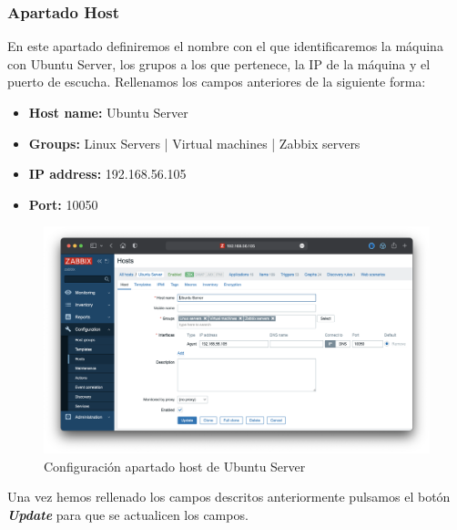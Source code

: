 \subsubsection{Apartado Host}
En este apartado definiremos el nombre con el que identificaremos la máquina con Ubuntu Server, los grupos a los que pertenece, la IP de la máquina y el puerto de escucha. Rellenamos los campos anteriores de la siguiente forma:
    \begin{itemize}
        \item \textbf{Host name:} Ubuntu Server
        \item \textbf{Groups:} Linux Servers | Virtual machines | Zabbix servers
        \item \textbf{IP address:} 192.168.56.105
        \item \textbf{Port:} 10050
    \end{itemize}
    \begin{figure}[H]
        \centering
        \includegraphics[scale=0.35]{images/ubuntu_server_conf.png}
        \caption{Configuración apartado host de Ubuntu Server}
        \label{fig:ubuntu_server_conf}
    \end{figure}
Una vez hemos rellenado los campos descritos anteriormente pulsamos el botón \textbf{\emph{Update}} para que se actualicen los campos.

